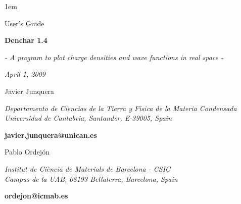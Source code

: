 %
%
%
%



\textheight 22cm
\textwidth 16cm
\oddsidemargin 1mm
\topmargin -15mm

\baselineskip=14pt
\parskip 5pt
\parindent 1em




\begin{titlepage}

\begin{center}

\vspace{1cm}

{\huge {\sc User's Guide}}

\vspace{4cm}

{\Huge {\bf {\sc Denchar} 1.4} }

\vspace{0.5 cm}

{\Large {\it - A program to plot charge densities and wave functions 
in real space -}}


\vspace{3cm}

{\Large {\it April 1, 2009} }

\vspace{3cm}
{\Large Javier Junquera}

\vspace{5pt}


{\it Departamento de Ciencias de la Tierra y F\'{\i}sica de
     la Materia Condensada \\
     Universidad de Cantabria, Santander, E-39005, Spain}

\vspace{2pt}
{\bf javier.junquera@unican.es }

\vspace{1cm}

{\Large Pablo Ordej\'on}

\vspace{5pt}

{\it Institut de Ci\`encia de Materials de Barcelona - CSIC\\
Campus de la UAB, 08193 Bellaterra, Barcelona, Spain}

\vspace{2pt}
{\bf ordejon@icmab.es}
\vspace{7mm}
\end{center}

\end{titlepage}

